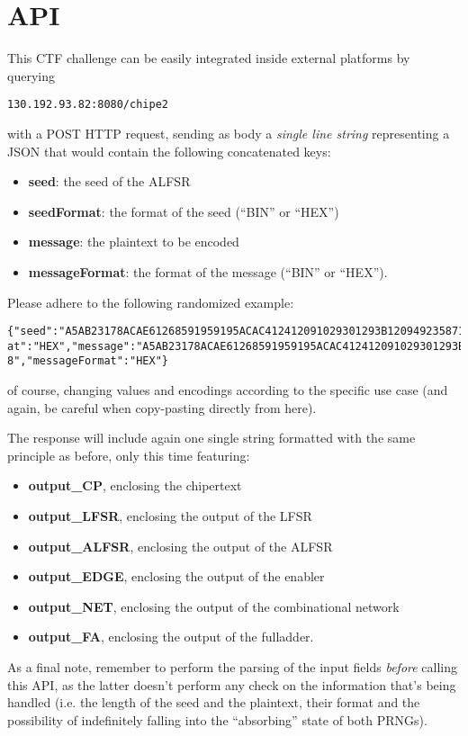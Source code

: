 \chapter{API}
\label{api}
This CTF challenge can be easily integrated inside external platforms by querying
\begin{verbatim}130.192.93.82:8080/chipe2\end{verbatim}
with a POST HTTP request, sending as body a \emph{single line string} representing a JSON that would contain the following concatenated keys:
\begin{itemize}
\item \textbf{seed}: the seed of the ALFSR
\item \textbf{seedFormat}: the format of the seed (``BIN'' or ``HEX'')
\item \textbf{message}: the plaintext to be encoded
\item \textbf{messageFormat}: the format of the message (``BIN'' or ``HEX'').
\end{itemize}
Please adhere to the following randomized example: 
\begin{verbatim}
{"seed":"A5AB23178ACAE61268591959195ACAC412412091029301293B12094923587128","seedForm
at":"HEX","message":"A5AB23178ACAE61268591959195ACAC412412091029301293B1209492358712
8","messageFormat":"HEX"}
\end{verbatim}
of course, changing values and encodings according to the specific use case (and again, be careful when copy-pasting directly from here). 

The response will include again one single string formatted with the same principle as before, only this time featuring:
\begin{itemize}
\item \textbf{output\_CP}, enclosing the chipertext
\item \textbf{output\_LFSR}, enclosing the output of the LFSR
\item \textbf{output\_ALFSR}, enclosing the output of the ALFSR
\item \textbf{output\_EDGE}, enclosing the output of the enabler
\item \textbf{output\_NET}, enclosing the output of the combinational network
\item \textbf{output\_FA}, enclosing the output of the fulladder.
\end{itemize}

As a final note, remember to perform the parsing of the input fields \emph{before} calling this API, as the latter doesn't perform any check on the information that's being handled (i.e. the length of the seed and the plaintext, their format and the possibility of indefinitely falling into the ``absorbing'' state of both PRNGs).